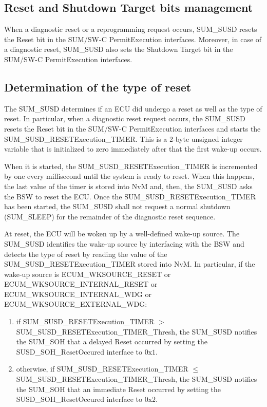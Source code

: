 \subsection{Reset and Shutdown Target bits management}\label{sec:reset_shutdown_target}
{When a diagnostic reset  or a reprogramming request occurs, SUM\_SUSD resets the Reset bit in the SUM/SW-C PermitExecution interfaces.
Moreover, in case of a diagnostic reset, SUM\_SUSD also sets the Shutdown Target bit in the SUM/SW-C PermitExecution interfaces.}
{ }

\subsection{Determination of the type of reset}\label{sec:reset_shutdown_target}

{The SUM_SUSD determines if an ECU did undergo a reset as well as the type of reset. In particular, when a diagnostic reset request occurs, the SUM_SUSD resets the Reset bit in the
SUM/SW-C PermitExecution interfaces and starts the SUM\_SUSD\_RESETExecution\_TIMER. This is a 2-byte unsigned integer variable that is initialized to zero immediately after that
the first wake-up occurs. 

When it is started, the SUM\_SUSD\_RESETExecution\_TIMER is incremented by one every millisecond until the system is ready to reset. When this happens,
 the last value of the timer is stored into NvM and, then, the SUM\_SUSD asks the BSW to reset the ECU.
 Once the SUM\_SUSD\_RESETExecution\_TIMER has been started, the SUM\_SUSD shall not request a normal shutdown (SUM\_SLEEP) for the remainder of the diagnostic reset sequence.

 At reset, the ECU will be woken up by a well-defined wake-up source. The SUM\_SUSD identifies the wake-up source by interfacing with the BSW and detects the type of reset by
 reading the value of the SUM\_SUSD\_RESETExecution\_TIMER stored into NvM. In particular, if the wake-up source is ECUM\_WKSOURCE\_RESET or ECUM\_WKSOURCE\_INTERNAL\_RESET 
 or ECUM\_WKSOURCE\_INTERNAL\_WDG or ECUM\_WKSOURCE\_EXTERNAL\_WDG:
\begin{enumerate}
\item if SUM\_SUSD\_RESETExecution\_TIMER $>$ SUM\_SUSD\_RESETExecution\_TIMER\_Thresh, the SUM\_SUSD notifies the SUM\_SOH that a delayed Reset occurred by setting 
the SUSD\_SOH\_ResetOccured interface to $0\text{x}1$.
\item otherwise, if SUM\_SUSD\_RESETExecution\_TIMER $\le$ SUM\_SUSD\_RESETExecution\_TIMER\_Thresh, the SUM\_SUSD notifies the SUM\_SOH that an immediate Reset occurred
 by setting the SUSD\_SOH\_ResetOccured interface to $0\text{x}2$.
\end{enumerate}
}
{         }



